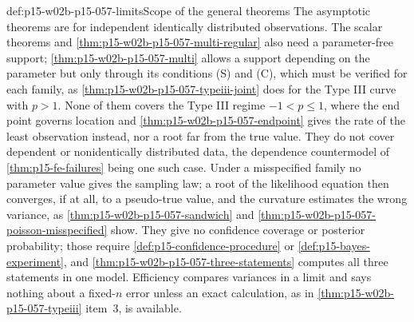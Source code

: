 \begin{hbwarning}{def:p15-w02b-p15-057-limits}{Scope of the general theorems}
The asymptotic theorems are for independent identically distributed
observations. The scalar theorems and \cref{thm:p15-w02b-p15-057-multi-regular}
also need a parameter-free support; \cref{thm:p15-w02b-p15-057-multi}
allows a support depending on the parameter but only through its
conditions (S) and (C), which must be verified for each family, as
\cref{thm:p15-w02b-p15-057-typeiii-joint} does for the Type III curve with
\(p>1\). None of them covers the Type III regime \(-1<p\leq1\), where the
end point governs location and \cref{thm:p15-w02b-p15-057-endpoint} gives
the rate of the least observation instead, nor a root far from the true
value. They do
not cover dependent or nonidentically
distributed data, the dependence countermodel of
\cref{thm:p15-fe-failures} being one such case. Under a misspecified
family no parameter value gives the sampling law; a root of the likelihood
equation then converges, if at all, to a pseudo-true value, and the
curvature estimates the wrong variance, as
\cref{thm:p15-w02b-p15-057-sandwich} and
\cref{thm:p15-w02b-p15-057-poisson-misspecified} show. They give no confidence coverage or posterior probability; those
require \cref{def:p15-confidence-procedure} or
\cref{def:p15-bayes-experiment}, and
\cref{thm:p15-w02b-p15-057-three-statements} computes all three
statements in one model. Efficiency compares variances in a limit
and says nothing about a fixed-\(n\) error unless an exact calculation, as
in \cref{thm:p15-w02b-p15-057-typeiii} item~3, is available.
\end{hbwarning}

